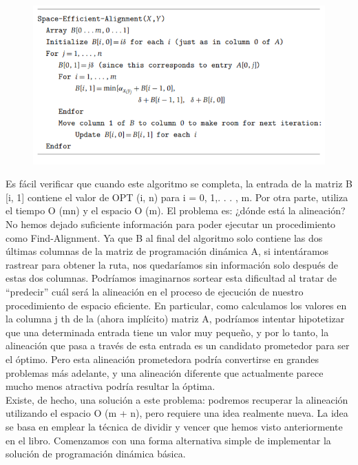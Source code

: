\documentclass[a4paper, 12pt]{book}
\theoremstyle{dotless}
\begin{document}
\begin{figure}[h]
\centering
\includegraphics[scale=1]{Imagenes-Seccion6/cod6_14.PNG}
\end{figure}

Es fácil verificar que cuando este algoritmo se completa, la entrada de la matriz B [i, 1] contiene el valor de OPT (i, n) para i = 0, 1,. . . , m. Por otra parte, utiliza el tiempo O (mn) y el espacio O (m). El problema es: ¿dónde está la alineación? No hemos dejado suficiente información para poder ejecutar un procedimiento como Find-Alignment. Ya que B al final del algoritmo solo contiene las dos últimas columnas de la matriz de programación dinámica A, si intentáramos rastrear para obtener la ruta, nos quedaríamos sin información solo después de estas dos columnas. Podríamos imaginarnos sortear esta dificultad al tratar de ``predecir'' cuál será la alineación en el proceso de ejecución de nuestro procedimiento de espacio eficiente. En particular, como calculamos los valores en la columna j th de la
(ahora implícito) matriz A, podríamos intentar hipotetizar que una determinada entrada tiene un valor muy pequeño, y por lo tanto, la alineación que pasa a través de esta entrada es un candidato prometedor para ser el óptimo. Pero esta alineación prometedora podría convertirse en grandes problemas más adelante, y una alineación diferente que actualmente parece mucho menos atractiva podría resultar la óptima.\\

Existe, de hecho, una solución a este problema: podremos recuperar la alineación utilizando el espacio O (m + n), pero requiere una idea realmente nueva. La idea se basa en emplear la técnica de dividir y vencer que hemos visto anteriormente en el libro. Comenzamos con una forma alternativa simple de implementar la solución de programación dinámica básica.\\
\end{document}
